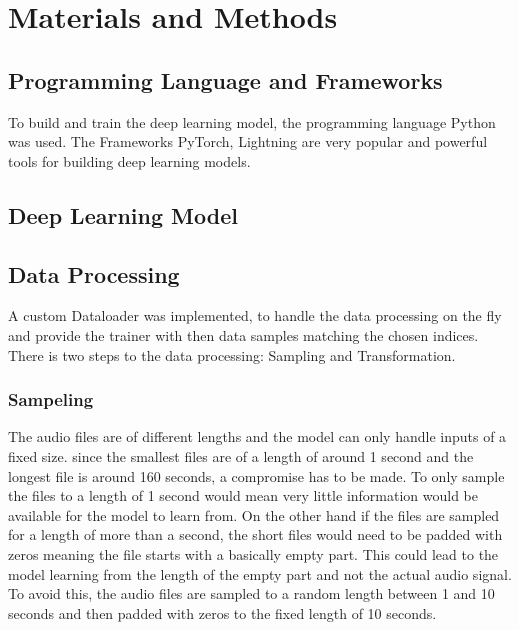 

\section{Materials and Methods}
\label{section2}

\subsection{Programming Language and Frameworks}
To build and train the deep learning model, the programming language Python was used.
The Frameworks PyTorch, Lightning are very popular and powerful tools for building deep learning models.

\subsection{Deep Learning Model}

\subsection{Data Processing}
A custom Dataloader was implemented, to handle the data processing on the fly
and provide the trainer with then data samples matching the chosen indices.
There is two steps to the data processing: Sampling and Transformation.

\subsubsection{Sampeling}
The audio files are of different lengths and the model can only handle inputs of a fixed size.
since the smallest files are of a length of around 1 second and the longest file is around
160 seconds, a compromise has to be made. To only sample the files to a length of 1 second
would mean very little information would be available for the model to learn from. On the other
hand if the files are sampled for a length of more than a second, the short files would need
to be padded with zeros meaning the file starts with a basically empty part. This could lead
to the model learning from the length of the empty part and not the actual audio signal.
To avoid this, the audio files are sampled to a random length between 1 and 10 seconds and
then padded with zeros to the fixed length of 10 seconds.

